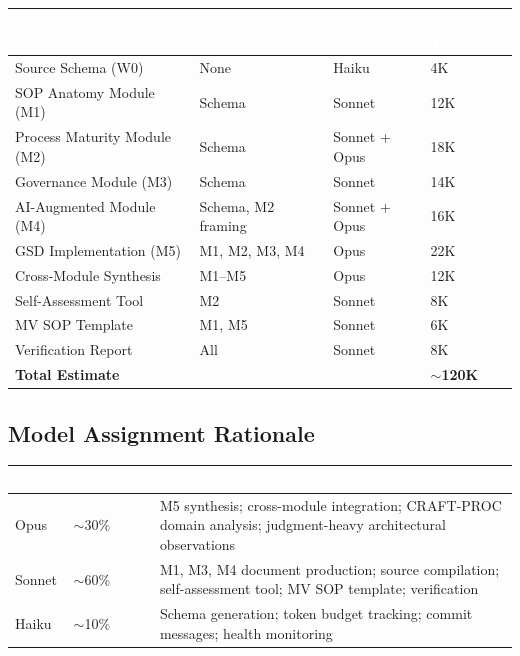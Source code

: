 \documentclass[11pt,letterpaper]{article}
\newcommand{\tableheader}[1]{\textbf{\sffamily\textcolor{white}{#1}}}
\begin{document}
\begin{center}
\begin{tabularx}{\textwidth}{L{4cm}L{3cm}L{2cm}L{2cm}}
\toprule
{}
\tableheader{Component} & \tableheader{Dependencies} & \tableheader{Model} & \tableheader{Est. Tokens} \\
\midrule
Source Schema (W0) & None & Haiku & 4K \\
SOP Anatomy Module (M1) & Schema & Sonnet & 12K \\
Process Maturity Module (M2) & Schema & Sonnet + Opus & 18K \\
Governance Module (M3) & Schema & Sonnet & 14K \\
AI-Augmented Module (M4) & Schema, M2 framing & Sonnet + Opus & 16K \\
GSD Implementation (M5) & M1, M2, M3, M4 & Opus & 22K \\
Cross-Module Synthesis & M1--M5 & Opus & 12K \\
Self-Assessment Tool & M2 & Sonnet & 8K \\
MV SOP Template & M1, M5 & Sonnet & 6K \\
Verification Report & All & Sonnet & 8K \\
\midrule
\textbf{Total Estimate} & & & \textbf{$\sim$120K} \\
\bottomrule
\end{tabularx}
\end{center}

\subsection{Model Assignment Rationale}

\begin{center}
\begin{tabularx}{\textwidth}{L{2cm}L{2.5cm}X}
\toprule
{}
\tableheader{Model} & \tableheader{Allocation} & \tableheader{Assigned Tasks} \\
\midrule
Opus & $\sim$30\% & M5 synthesis; cross-module integration; CRAFT-PROC domain analysis; judgment-heavy architectural observations \\
Sonnet & $\sim$60\% & M1, M3, M4 document production; source compilation; self-assessment tool; MV SOP template; verification \\
Haiku & $\sim$10\% & Schema generation; token budget tracking; commit messages; health monitoring \\
\bottomrule
\end{tabularx}
\end{center}
\end{document}
